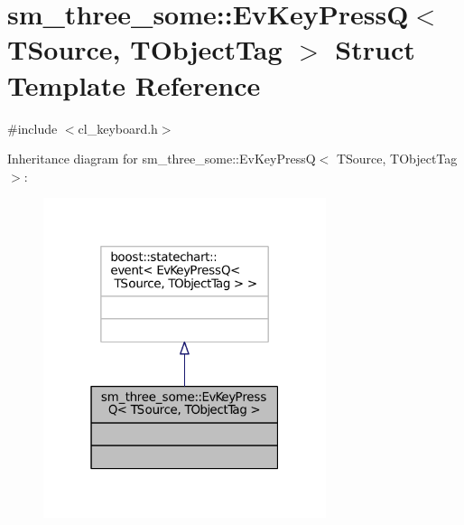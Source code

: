 \hypertarget{structsm__three__some_1_1EvKeyPressQ}{}\section{sm\+\_\+three\+\_\+some\+:\+:Ev\+Key\+PressQ$<$ T\+Source, T\+Object\+Tag $>$ Struct Template Reference}
\label{structsm__three__some_1_1EvKeyPressQ}


{\ttfamily \#include $<$cl\+\_\+keyboard.\+h$>$}



Inheritance diagram for sm\+\_\+three\+\_\+some\+:\+:Ev\+Key\+PressQ$<$ T\+Source, T\+Object\+Tag $>$\+:
\nopagebreak
\begin{figure}[H]
\begin{center}
\leavevmode
\includegraphics[width=235pt]{structsm__three__some_1_1EvKeyPressQ__inherit__graph}
\end{center}
\end{figure}


